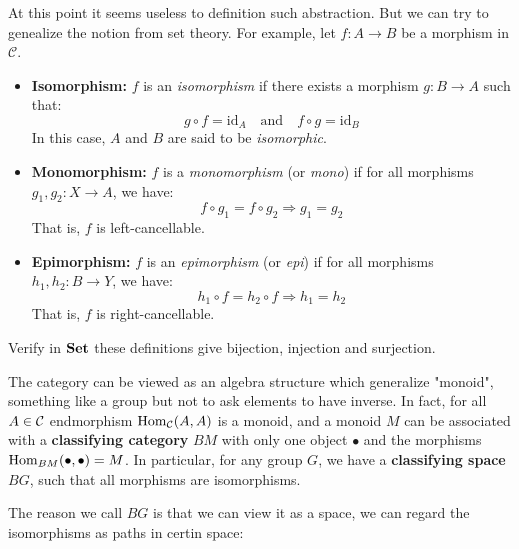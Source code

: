 At this point it seems useless to definition such abstraction. But we can try to genealize the notion from set theory. For example, let $f: A \to B$ be a morphism in $\mathcal{C}$.

\begin{itemize}
    \item \textbf{Isomorphism:} $f$ is an \emph{isomorphism} if there exists a morphism $g: B \to A$ such that:
    \[
    g \circ f = \mathrm{id}_A \quad \text{and} \quad f \circ g = \mathrm{id}_B
    \]
    In this case, $A$ and $B$ are said to be \emph{isomorphic}.

    \item \textbf{Monomorphism:} $f$ is a \emph{monomorphism} (or \emph{mono}) if for all morphisms $g_1, g_2: X \to A$, we have:
    \[
    f \circ g_1 = f \circ g_2 \Rightarrow g_1 = g_2
    \]
    That is, $f$ is left-cancellable.

    \item \textbf{Epimorphism:} $f$ is an \emph{epimorphism} (or \emph{epi}) if for all morphisms $h_1, h_2: B \to Y$, we have:
    \[
    h_1 \circ f = h_2 \circ f \Rightarrow h_1 = h_2
    \]
    That is, $f$ is right-cancellable.

\end{itemize}
\begin{exercise}
 Verify in $\mathbf{Set}$ these definitions give bijection, injection and surjection. 
\end{exercise}

\begin{example}
  The category can be viewed as an algebra structure which generalize "monoid", something like a group but not to ask elements to have inverse. In fact, for all $A\in \mathcal{C}$ endmorphism $\mathrm{Hom}_{\mathcal{C}}(A,A)$ is a monoid, and a monoid $M$ can be associated with a \textbf{ classifying category } $BM$ with only one object $\bullet$ and the morphisms $\mathrm{Hom}_{BM}(\bullet, \bullet)= M$. In particular, for any group $G$, we have a \textbf{ classifying space } $BG$, such that all morphisms are isomorphisms.
\end{example}

The reason we call $BG$ is that we can view it as a space, we can regard the isomorphisms as paths in certin space:

